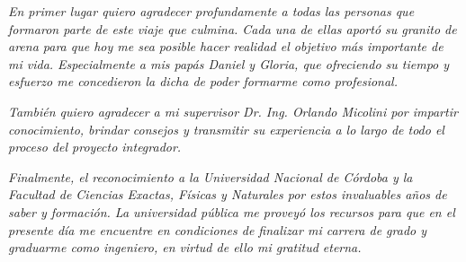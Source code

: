 \documentclass[a4paper,12pt]{article}
\begin{document}
\begin{flushright}
	\textit{En primer lugar quiero agradecer profundamente a todas las personas que formaron parte de este viaje que culmina. Cada una de ellas aportó su granito de arena para que hoy me sea posible hacer realidad el objetivo más importante de mi vida. Especialmente a mis papás Daniel y Gloria, que ofreciendo su tiempo y esfuerzo me concedieron la dicha de poder formarme como profesional.}
\end{flushright}

\begin{flushright}
	\textit{También quiero agradecer a mi supervisor Dr. Ing. Orlando Micolini por impartir conocimiento, brindar consejos y transmitir su experiencia a lo largo de todo el proceso del proyecto integrador.}
\end{flushright}

\begin{flushright}
	\textit{Finalmente, el reconocimiento a la Universidad Nacional de Córdoba y la Facultad de Ciencias Exactas, Físicas y Naturales por estos invaluables años de saber y formación. La universidad pública me proveyó los recursos para que en el presente día me encuentre en condiciones de finalizar mi carrera de grado y graduarme como ingeniero, en virtud de ello mi gratitud eterna.}
\end{flushright}

\vspace*{\fill}

\clearpage

\tableofcontents

%
%
\clearpage
\end{document}
